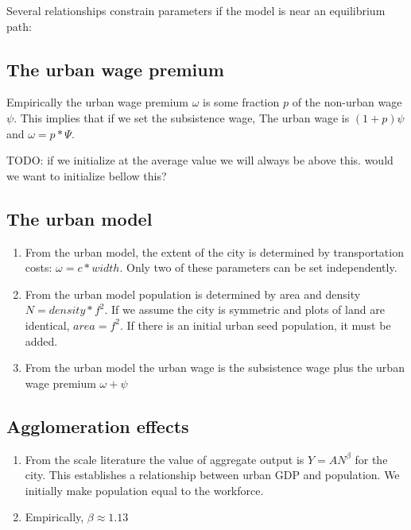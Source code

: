 Several relationships constrain parameters if the model is near an equilibrium path: 

\subsection{The urban wage premium}

Empirically the urban wage premium $\omega$ is some fraction $p$ of the non-urban wage $\psi$.   This implies that if we set the subsistence wage, The urban wage is $(1+p)\psi$ and $\omega= p*\Psi$.

TODO: if we initialize at the average value we will always be above this. would we want to initialize bellow this?

\subsection{The urban model}
\begin{enumerate}
    \item From the urban model, the extent of the city is determined by transportation costs:   $\omega =c*width$.  Only two of these parameters can be set independently.

    \item From the urban model population is determined by area and density   $N=density* f^2$. If we assume the city is symmetric  and plots  of land are identical, $area=f^2$. If there is an initial urban seed population, it must be added.  
   
    \item From the urban model the urban wage is the subsistence wage plus the urban wage premium $\omega+\psi$ 
\end{enumerate}

\subsection{Agglomeration effects}
\begin{enumerate}
    \item From the scale literature the value of aggregate output is $Y=AN^\beta$ for the city. This establishes a relationship between urban GDP and population. We initially make population equal to the workforce. 

    \item Empirically, $\beta \approx 1.13$
\end{enumerate}

